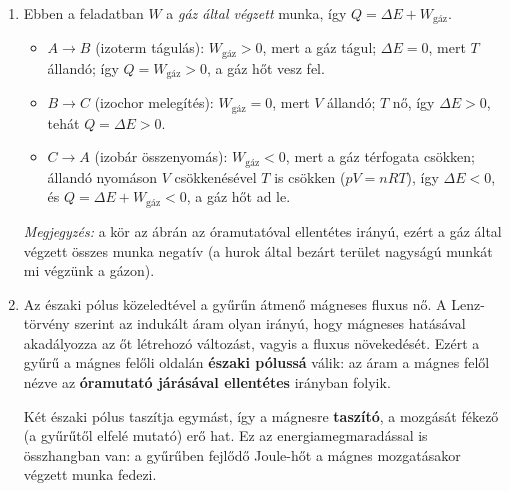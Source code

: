 \documentclass[11pt,a4paper]{article}
\begin{document}
\begin{enumerate}[leftmargin=*,label=\textbf{\arabic*.},itemsep=9pt,topsep=0pt,parsep=0pt]
Erő--ellenerő párok (mindig \emph{két különböző testre} hatnak):
\begin{itemize}[nosep,leftmargin=1.5em]
  \item A Föld vonzza a könyvet $\leftrightarrow$ a könyv vonzza a Földet (a Föld
    középpontja felé mutató erő, a Földre hat).
  \item Az asztal felfelé nyomja a könyvet $\leftrightarrow$ a könyv lefelé nyomja az
    asztalt (a könyv súlya, az asztalra hat).
\end{itemize}
\textbf{Tipikus hiba:} $G$ és $N$ \emph{nem} erő--ellenerő pár, mert ugyanarra a testre
hatnak. Azért egyenlő nagyságúak, mert a könyv nyugalomban van (Newton I./II.\
törvénye), nem a III.\ törvény miatt.

\item Ebben a feladatban $W$ a \emph{gáz által végzett} munka, így $Q = \Delta E + W_\text{gáz}$.
\begin{itemize}[nosep,leftmargin=1.5em]
  \item $A\to B$ (izoterm tágulás): $W_\text{gáz} > 0$, mert a gáz tágul;
    $\Delta E = 0$, mert $T$ állandó; így $Q = W_\text{gáz} > 0$, a gáz hőt vesz fel.
  \item $B\to C$ (izochor melegítés): $W_\text{gáz} = 0$, mert $V$ állandó;
    $T$ nő, így $\Delta E > 0$, tehát $Q = \Delta E > 0$.
  \item $C\to A$ (izobár összenyomás): $W_\text{gáz} < 0$, mert a gáz térfogata csökken;
    állandó nyomáson $V$ csökkenésével $T$ is csökken ($pV = nRT$), így $\Delta E < 0$,
    és $Q = \Delta E + W_\text{gáz} < 0$, a gáz hőt ad le.
\end{itemize}
\emph{Megjegyzés:} a kör az ábrán az óramutatóval ellentétes irányú, ezért a gáz által
végzett összes munka negatív (a hurok által bezárt terület nagyságú munkát mi végzünk a
gázon).

\item Az északi pólus közeledtével a gyűrűn átmenő mágneses fluxus nő. A Lenz-törvény
szerint az indukált áram olyan irányú, hogy mágneses hatásával akadályozza az őt
létrehozó változást, vagyis a fluxus növekedését. Ezért a gyűrű a mágnes felőli oldalán
\textbf{északi pólussá} válik: az áram a mágnes felől nézve az \textbf{óramutató
járásával ellentétes} irányban folyik.

Két északi pólus taszítja egymást, így a mágnesre \textbf{taszító}, a mozgását fékező
(a gyűrűtől elfelé mutató) erő hat. Ez az energiamegmaradással is összhangban van: a
gyűrűben fejlődő Joule-hőt a mágnes mozgatásakor végzett munka fedezi.


\end{enumerate}
\end{document}
